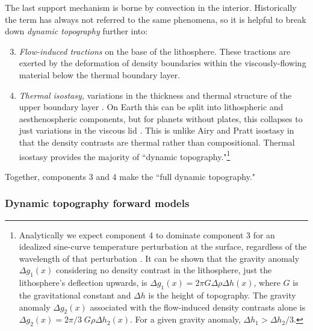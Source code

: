 The last support mechanism is borne by convection in the interior. Historically the term has always not referred to the same phenomena, so it is helpful to break down \emph{dynamic topography} further \citep{Orth2011, Molnar2015} into:
\begin{enumerate}
\setcounter{enumi}{2}
\item \emph{Flow-induced tractions} on the base of the lithosphere. These tractions are exerted by the deformation of density boundaries within the viscously-flowing material below the thermal boundary layer.
\item \emph{Thermal isostasy,} variations in the thickness and thermal structure of the upper boundary layer \citep{Fowler1985}. On Earth this can be split into lithospheric and aesthenospheric components, but for planets without plates, this collapses to just variations in the viscous lid \citep[see][]{Orth2011}. This is unlike Airy and Pratt isostasy in that the density contrasts are thermal rather than compositional. Thermal isostasy provides the majority of ``dynamic topography."\footnote{Analytically we expect component 4 to dominate component 3 for an idealized sine-curve temperature perturbation at the surface, regardless of the wavelength of that perturbation \citep{McKenzie1977}. It can be shown that the gravity anomaly $\Delta g_1(x)$ considering no density contrast in the lithosphere, just the lithosphere's deflection upwards, is $\Delta g_1(x) = 2\pi G \Delta \rho \Delta h(x)$, where $G$ is the gravitational constant and $\Delta h$ is the height of topography. The gravity anomaly $\Delta g_2(x)$ associated with the flow-induced density contrasts alone is $\Delta g_2(x) = 2\pi/3 \; G\rho\Delta h_2(x)$. For a given gravity anomaly, $\Delta h_1 > \Delta h_2/3$.}
\end{enumerate}
Together, components 3 and 4 make the ``full dynamic topography."





\subsubsection{Dynamic topography forward models}\label{sec:dyn_top_forward}


